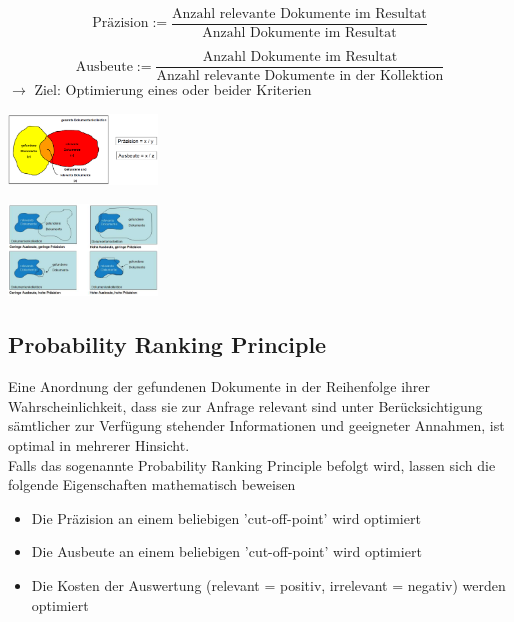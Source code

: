 \documentclass{report}
\newenvironment{Figure}
	{\par\medskip\noindent\minipage{\linewidth}}
	{\endminipage\par\medskip}
\theoremstyle{definition}
\theoremstyle{example}
\begin{document}
\begin{equation}
   \text{Präzision} := \frac{\text{Anzahl relevante Dokumente im Resultat}}{\text{Anzahl Dokumente im Resultat}}
\end{equation}

\begin{equation}
   \text{Ausbeute} := \frac{\text{Anzahl Dokumente im Resultat}}{\text{Anzahl relevante Dokumente in der Kollektion}}
\end{equation}
$\rightarrow$ Ziel: Optimierung eines oder beider Kriterien\\

\begin{Figure}
   \centering
    \includegraphics[width=150px]{img/AusbeutePraezision.png}
        \label{fig:Visualisierung der Messgroessen}
\end{Figure}

\begin{Figure}
   \centering
    \includegraphics[width=150px]{img/AusbeutePraezisionSzenarien.png}
        \label{fig:Szenarien der Messgroessen}
\end{Figure}

\subsection{Probability Ranking Principle}
Eine Anordnung der gefundenen Dokumente in der Reihenfolge ihrer Wahrscheinlichkeit, dass sie zur Anfrage relevant sind
unter Berücksichtigung sämtlicher zur Verfügung stehender Informationen und geeigneter Annahmen, ist optimal in mehrerer Hinsicht.\\
Falls das sogenannte Probability Ranking Principle befolgt wird, lassen sich die folgende Eigenschaften mathematisch beweisen
\begin{itemize}
   \item Die Präzision an einem beliebigen 'cut-off-point' wird optimiert
   \item Die Ausbeute an einem beliebigen 'cut-off-point' wird optimiert
   \item Die Kosten der Auswertung (relevant = positiv, irrelevant = negativ) werden optimiert
\end{itemize}
\end{document}
